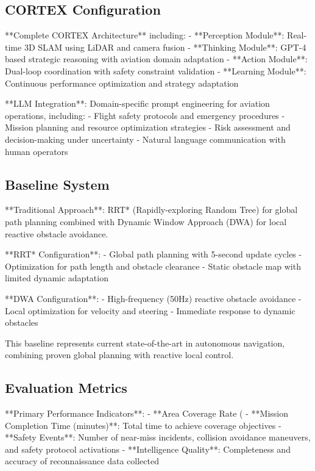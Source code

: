 \subsection{CORTEX Configuration}

**Complete CORTEX Architecture** including:
- **Perception Module**: Real-time 3D SLAM using LiDAR and camera fusion
- **Thinking Module**: GPT-4 based strategic reasoning with aviation domain adaptation
- **Action Module**: Dual-loop coordination with safety constraint validation
- **Learning Module**: Continuous performance optimization and strategy adaptation

**LLM Integration**: Domain-specific prompt engineering for aviation operations, including:
- Flight safety protocols and emergency procedures
- Mission planning and resource optimization strategies
- Risk assessment and decision-making under uncertainty
- Natural language communication with human operators

\subsection{Baseline System}

**Traditional Approach**: RRT* (Rapidly-exploring Random Tree) for global path planning combined with Dynamic Window Approach (DWA) for local reactive obstacle avoidance.

**RRT* Configuration**:
- Global path planning with 5-second update cycles
- Optimization for path length and obstacle clearance
- Static obstacle map with limited dynamic adaptation

**DWA Configuration**:
- High-frequency (50Hz) reactive obstacle avoidance
- Local optimization for velocity and steering
- Immediate response to dynamic obstacles

This baseline represents current state-of-the-art in autonomous navigation, combining proven global planning with reactive local control.

\subsection{Evaluation Metrics}

**Primary Performance Indicators**:
- **Area Coverage Rate (%
- **Mission Completion Time (minutes)**: Total time to achieve coverage objectives
- **Safety Events**: Number of near-miss incidents, collision avoidance maneuvers, and safety protocol activations
- **Intelligence Quality**: Completeness and accuracy of reconnaissance data collected

